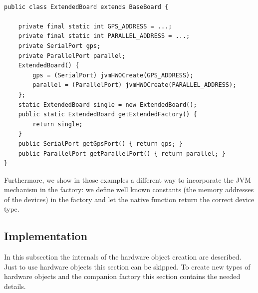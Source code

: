 \begin{lstlisting}[float=t,caption={An extended class of a hardware object
factory for a board variation}, label=lst:hwo:ext:fact]

public class ExtendedBoard extends BaseBoard {

    private final static int GPS_ADDRESS = ...;
    private final static int PARALLEL_ADDRESS = ...;
    private SerialPort gps;
    private ParallelPort parallel;
    ExtendedBoard() {
        gps = (SerialPort) jvmHWOCreate(GPS_ADDRESS);
        parallel = (ParallelPort) jvmHWOCreate(PARALLEL_ADDRESS);
    };
    static ExtendedBoard single = new ExtendedBoard();
    public static ExtendedBoard getExtendedFactory() {
        return single;
    }
    public SerialPort getGpsPort() { return gps; }
    public ParallelPort getParallelPort() { return parallel; }
}
\end{lstlisting}




Furthermore, we show in those examples a different way to incorporate
the JVM mechanism in the factory: we define well known constants (the
memory addresses of the devices) in the factory and let the native
function  return the correct device type.

%
%

\subsection{Implementation}

\label{sec:hwo:implementation}

In this subsection the internals of the hardware object creation are
described. Just to use hardware objects this section can be skipped.
To create new types of hardware objects and the companion factory
this section contains the needed details.

